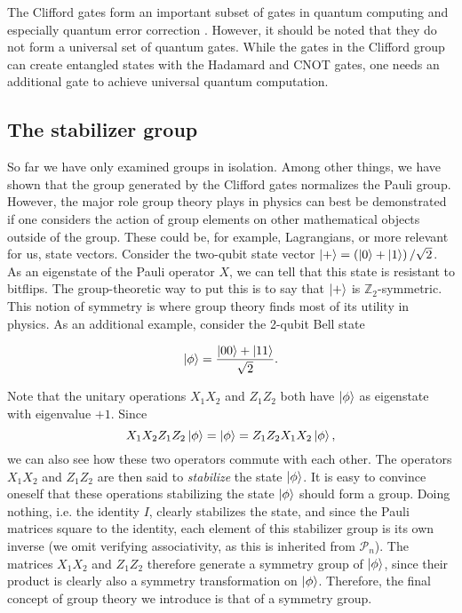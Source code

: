 The Clifford gates form an important subset of gates in quantum computing and
especially quantum error correction
\cite{calderbankQuantumErrorCorrection1997,calderbankGoodQuantumErrorcorrecting1996,steaneMultipleParticleInterferenceQuantum1996,bennettQuantumCryptographyPublic2020,bennettCommunicationOneTwoparticle1992}.
However, it should be noted that they do not form a universal set
of quantum gates. While the gates in the Clifford group can create entangled
states with the Hadamard and CNOT gates, one needs an additional gate to
achieve universal quantum computation.
\subsection{The stabilizer group}\label{sec:stabilizergroup}

So far we have only examined groups in isolation. Among other things, we have
shown that the group generated by the Clifford gates normalizes the Pauli
group.  However, the major role group theory plays in physics can best be
demonstrated if one considers the action of group elements on other
mathematical objects outside of the group. These could be, for example,
Lagrangians, or more relevant for us, state vectors. Consider the
two-qubit state vector $\ket{+} = \left( \ket{0} + \ket{1} \right) / \sqrt{2}$.
As an eigenstate of the Pauli operator $X$, we can tell that this state is
resistant to bitflips.  The group-theoretic way to put this is to say that
$\ket{+}$ is $\mathbb{Z}_2$-symmetric. This notion of symmetry is where group
theory finds most of its utility in physics.  As an additional example,
consider the 2-qubit Bell state

\begin{align}
  \ket{\phi} = \frac{\ket{00} + \ket{11}}{\sqrt{2}} 
.\end{align}

Note that the unitary operations $X_1 X_2$ and $Z_1 Z_2$ both have $\ket{\phi}$
as eigenstate with eigenvalue $+1$. Since $$X_1X_2Z_1Z_2\ket{\phi} = \ket{\phi} =
Z_1Z_2X_1X_2\ket{\phi},$$ we can also see how these two operators commute with each
other. The operators $X_1X_2$ and $Z_1Z_2$ are then said to \emph{stabilize} the
state $\ket{\phi}$. It is easy to convince oneself that these operations
stabilizing the state $\ket{\phi}$ should form a group. Doing nothing, i.e. the
identity $I$, clearly stabilizes the state, and since the Pauli matrices square
to the identity, each element of this stabilizer group is its own inverse (we
omit verifying associativity, as this is inherited from $\mathcal{P}_n$). The
matrices $X_1X_2$ and $Z_1Z_2$ therefore generate a symmetry group of
$\ket{\phi}$, since their product is clearly also a symmetry transformation on
$\ket{\phi}$. Therefore, the final concept of group theory we introduce is that
of a symmetry group.

